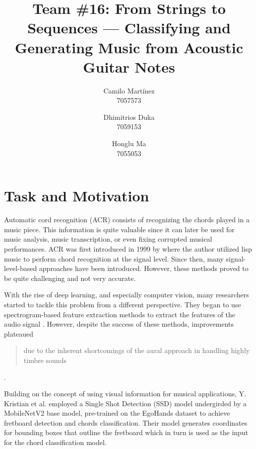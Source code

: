 \documentclass[10pt,twocolumn,letterpaper]{article}
\begin{document}
\title{Team \#16: From Strings to Sequences --- Classifying and Generating Music from Acoustic Guitar Notes}

\author{
 Camilo Martínez\\
 7057573\\
    \and
 Dhimitrios Duka\\
 7059153\\
    \and
 Honglu Ma\\
 7055053\\
}
\maketitle

\section{Task and Motivation}
Automatic cord recognition (ACR) consists of recognizing the chords played in a music piece. This information is quite valuable since it can later be used for music analysis, music transcription, or even fixing corrupted musical performances. ACR was first introduced in 1999 by \cite{takuya1999realtime} where the author utilized lisp music to perform chord recognition at the signal level. Since then, many signal-level-based approaches have been introduced. However, these methods proved to be quite challenging and not very accurate.

With the rise of deep learning, and especially computer vision, many researchers started to tackle this problem from a different perspective. They began to use spectrogram-based feature extraction methods to extract the features of the audio signal \cite{boulanger2013audio, korzeniowski2016feature, stark2009real}. However, despite the success of these methods, improvements plateaued \blockquote{due to the inherent shortcomings of the aural approach in handling highly timbre sounds} \cite{du2023conditional}.


Building on the concept of using visual information for musical applications, Y. Kristian et al. \cite{Kristian_Zaman_Tenoyo_Jodhinata_2024} employed a Single Shot Detection (SSD) model undergirded by a MobileNetV2 base model, pre-trained on the EgoHands dataset to achieve fretboard detection and chords classification. Their model generates coordinates for bounding boxes that outline the fretboard which in turn is used as the input for the chord classification model.
\end{document}
